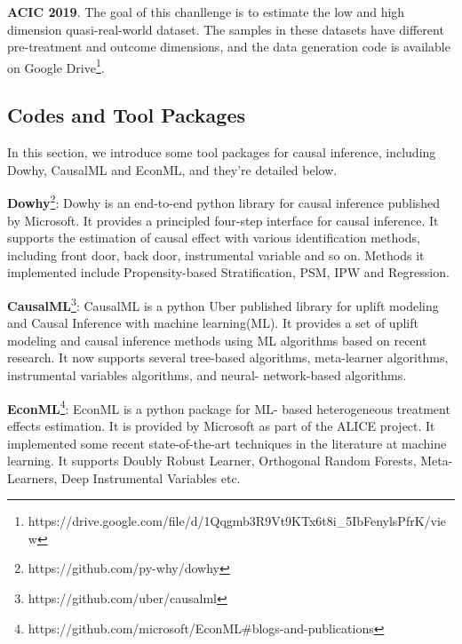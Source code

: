 \textbf{ACIC 2019}.
The goal of this chanllenge is to estimate the low and high dimension quasi-real-world dataset.
The samples in these datasets have different pre-treatment and outcome dimensions, and the data generation code is
available on Google Drive\footnote{https://drive.google.com/file/d/1Qqgmb3R9Vt9KTx6t8i\_5IbFenylsPfrK/view}.

\subsection{Codes and Tool Packages}\label{subsec:codes-and-tool-packages}

In this section, we introduce some tool packages for causal inference, including Dowhy\cite{sharma2020dowhy}, CausalML
and EconML\cite{bach2022doubleml}, and they're detailed below.

\textbf{Dowhy}\footnote{https://github.com/py-why/dowhy}: Dowhy is an end-to-end python library for causal inference
published by Microsoft.
It provides a principled four-step interface for causal inference.
It supports the estimation of causal effect with various identification methods, including front door, back door,
instrumental variable and so on.
Methods it implemented include Propensity-based Stratification, PSM, IPW and Regression.

\textbf{CausalML}\footnote{https://github.com/uber/causalml}: CausalML is a python Uber published library for uplift
modeling and Causal Inference with machine learning(ML).
It provides a set of uplift modeling and causal inference methods using ML algorithms based on recent research.
It now supports several tree-based algorithms, meta-learner algorithms, instrumental variables algorithms, and neural-
network-based algorithms.

\textbf{EconML}\footnote{https://github.com/microsoft/EconML#blogs-and-publications}: EconML is a python package for ML-
based heterogeneous treatment effects estimation.
It is provided by Microsoft as part of the ALICE project.
It implemented some recent state-of-the-art techniques in the literature at machine learning.
It supports Doubly Robust Learner, Orthogonal Random Forests, Meta-Learners, Deep Instrumental Variables etc.


